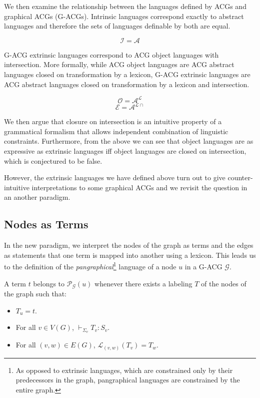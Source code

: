 \documentclass{llncs}
\begin{document}
We then examine the relationship between the languages defined by ACGs
and graphical ACGs (G-ACGs). Intrinsic languages correspond exactly to
abstract languages and therefore the sets of languages definable by both
are equal.

$$
\mathcal{I} = \mathcal{A}
$$

G-ACG extrinsic languages correspond to ACG object languages with
intersection. More formally, while ACG object languages are ACG abstract
languages closed on transformation by a lexicon, G-ACG extrinsic languages are
ACG abstract languages closed on transformation by a lexicon and intersection.

$$
\mathcal{O} = \mathcal{A}^{\mathcal{L}}
$$
$$
\mathcal{E} = \mathcal{A}^{\mathcal{L}{\cap}}
$$

We then argue that closure on intersection is an intuitive property of a
grammatical formalism that allows independent combination of linguistic
constraints. Furthermore, from the above we can see that object languages are
as expressive as extrinsic languages iff object languages are closed on
intersection, which is conjectured to be false.

However, the extrinsic languages we have defined above turn out to give
counter-intuitive interpretations to some graphical ACGs and we revisit the
question in an another paradigm.

\subsection{Nodes as Terms}

In the new paradigm, we interpret the nodes of the graph as terms and the
edges as statements that one term is mapped into another using a lexicon. This
leads us to the definition of the \emph{pangraphical}\footnote{As opposed to
  extrinsic languages, which are constrained only by their predecessors in the
  graph, pangraphical languages are constrained by the entire graph.} language
of a node $u$ in a G-ACG $\mathcal{G}$.

A term $t$ belongs to $\mathcal{P}_{\mathcal{G}}(u)$ whenever there
exists a labeling $T$ of the nodes of the graph such that:

\begin{itemize}
  \item $T_u = t$.
  \item For all $v \in V(G)$, $\vdash_{\Sigma_v} T_v : S_v$.
  \item For all $(v,w) \in E(G)$, $\mathcal{L}_{(v,w)}(T_v) = T_w$.
\end{itemize}
\end{document}
